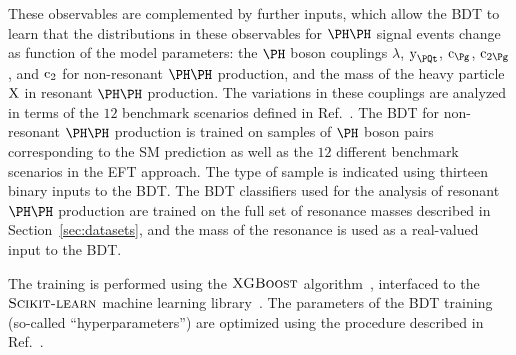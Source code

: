 These observables are complemented by further inputs, which allow the BDT to learn that the distributions in these observables for $\HH$ signal events
change as function of the model parameters:
the $\PHiggs$ boson couplings $\lambda$, $\yt$, $\cg$, $\cgg$, and $\text{c}_{2}$ for non-resonant $\HH$ production,
and the mass of the heavy particle $\textrm{X}$ in resonant $\HH$ production.
The variations in these couplings are analyzed in terms of the $12$ benchmark scenarios defined in Ref.~\cite{Carvalho:2015ttv}.
The BDT for non-resonant $\HH$ production is trained on samples of $\PHiggs$ boson pairs
corresponding to the SM prediction as well as the $12$ different benchmark scenarios in the EFT approach.
The type of sample is indicated using thirteen binary inputs to the BDT.
The BDT classifiers used for the analysis of resonant $\HH$ production are trained on the full set of resonance masses described in Section~\ref{sec:datasets},
and the mass of the resonance is used as a real-valued input to the BDT.

The training is performed using the $\textsc{XGBoost}$ algorithm~\cite{Chen:2016btl},
interfaced to the $\textsc{Scikit-learn}$ machine learning library~\cite{scikit-learn}.
The parameters of the BDT training (so-called ``hyperparameters'') are optimized using the procedure described in Ref.~\cite{Tani:2020dyi}.
